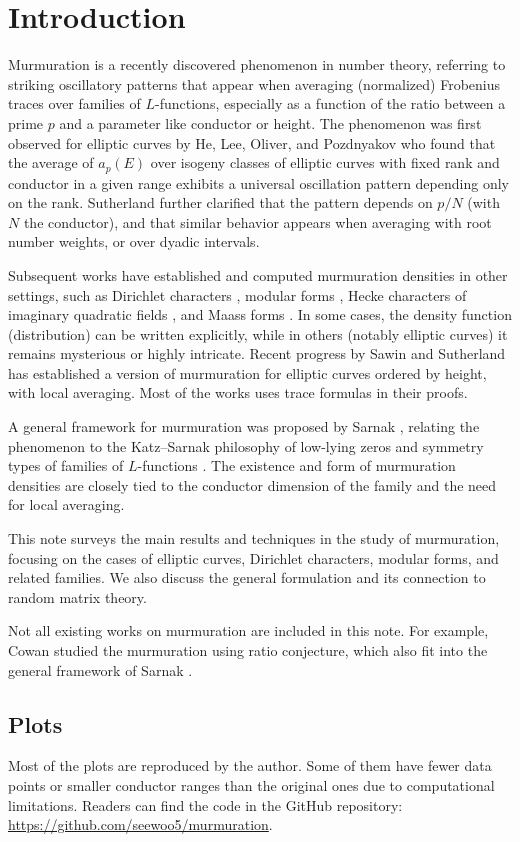 \section{Introduction}
\label{sec:intro}

Murmuration is a recently discovered phenomenon in number theory, referring to striking oscillatory patterns that appear when averaging (normalized) Frobenius traces over families of $L$-functions, especially as a function of the ratio between a prime $p$ and a parameter like conductor or height.
The phenomenon was first observed for elliptic curves by He, Lee, Oliver, and Pozdnyakov \cite{he2024murmurations} who found that the average of $a_p(E)$ over isogeny classes of elliptic curves with fixed rank and conductor in a given range exhibits a universal oscillation pattern depending only on the rank.
Sutherland \cite{sutherlandletter} further clarified that the pattern depends on $p/N$ (with $N$ the conductor), and that similar behavior appears when averaging with root number weights, or over dyadic intervals.

Subsequent works have established and computed murmuration densities in other settings, such as Dirichlet characters \cite{lee2025murmurations}, modular forms \cite{zubrilina2025murmurations,martin2025variations,martin2025distribution,bober2023murmurations}, Hecke characters of imaginary quadratic fields \cite{wang2025murmurations}, and Maass forms \cite{booker2024murmurations}.
In some cases, the density function (distribution) can be written explicitly, while in others (notably elliptic curves) it remains mysterious or highly intricate.
Recent progress by Sawin and Sutherland \cite{sawin2025murmurations} has established a version of murmuration for elliptic curves ordered by height, with local averaging.
Most of the works uses trace formulas in their proofs.

A general framework for murmuration was proposed by Sarnak \cite{sarnak}, relating the phenomenon to the Katz--Sarnak philosophy of low-lying zeros and symmetry types of families of $L$-functions \cite{katz1999zeroes,katz2023random}.
The existence and form of murmuration densities are closely tied to the conductor dimension of the family and the need for local averaging.

This note surveys the main results and techniques in the study of murmuration, focusing on the cases of elliptic curves, Dirichlet characters, modular forms, and related families. We also discuss the general formulation and its connection to random matrix theory.

Not all existing works on murmuration are included in this note.
For example, Cowan \cite{cowan2024murmurations} studied the murmuration using ratio conjecture, which also fit into the general framework of Sarnak \cite{sarnak}.

\subsection{Plots}

Most of the plots are reproduced by the author.
Some of them have fewer data points or smaller conductor ranges than the original ones due to computational limitations.
Readers can find the code in the GitHub repository: \url{https://github.com/seewoo5/murmuration}.